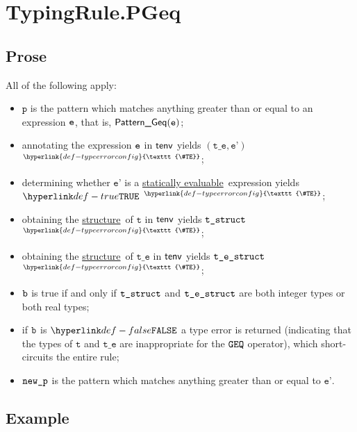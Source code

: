 \documentclass{book}
\newcommand\TypeErrorConfig[0]{\hyperlink{def-typeerrorconfig}{\texttt{\#TE}}}
\newcommand\ProseOrTypeError[0]{\hyperlink{def-proseortypeerror}{$^{\TypeErrorConfig}$}}
\newcommand\structure[0]{\hyperlink{def-structure}{structure}}
\newcommand\staticallyevaluable[0]{\hyperlink{def-staticallyevaluable}{statically evaluable}}
\newcommand\vp[0]{\texttt{p}}
\newcommand\vt[0]{\texttt{t}}
\newcommand\vte[0]{\texttt{t\_e}}
\newcommand\vep[0]{\texttt{e'}}
\begin{document}

\section{TypingRule.PGeq \label{sec:TypingRule.PGeq}}

\subsection{Prose}
All of the following apply:
\begin{itemize}
\item $\vp$ is the pattern which matches anything greater than or equal to an expression $\texttt{e}$,
that is, $\textsf{Pattern\_Geq}(\texttt{e})$;
\item annotating the expression $\texttt{e}$ in $\textsf{tenv}$ yields $(\vte, \vep)$ \ProseOrTypeError;
\item determining whether $\vep$ is a \staticallyevaluable\ expression yields $\True$ \ProseOrTypeError;
\item obtaining the \structure\ of $\vt$ in $\textsf{tenv}$ yields $\texttt{t\_struct}$ \ProseOrTypeError;
\item obtaining the \structure\ of $\vte$ in $\textsf{tenv}$ yields $\texttt{t\_e\_struct}$ \ProseOrTypeError;
\item $\texttt{b}$ is true if and only if $\texttt{t\_struct}$ and $\texttt{t\_e\_struct}$ are both integer types or both real types;
\item if $\texttt{b}$ is $\False$ a type error is returned (indicating that the types of $\vt$ and $\vte$
      are inappropriate for the $\texttt{GEQ}$ operator),
which short-circuits the entire rule;
\item $\texttt{new\_p}$ is the pattern which matches anything greater than or equal to $\vep$.
\end{itemize}

\subsection{Example}

\end{document}
